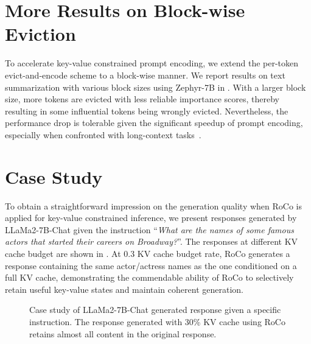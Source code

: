 \section{More Results on Block-wise Eviction} 
\label{sec:appendix_b}
To accelerate key-value constrained prompt encoding, we extend the per-token evict-and-encode scheme to a block-wise manner. We report results on text summarization with various block sizes using Zephyr-7B in . With a larger block size, more tokens are evicted with less reliable importance scores, thereby resulting in some influential tokens being wrongly evicted. Nevertheless, the performance drop is tolerable given the significant speedup of prompt encoding, especially when confronted with long-context tasks~\cite{liu2023lost,longbench,leval}.
\section{Case Study} 
\label{sec:appendix_c}
To obtain a straightforward impression on the generation quality when RoCo is applied for key-value constrained inference, we present responses generated by LLaMa2-7B-Chat given the instruction ``\textit{What are the names of some famous actors that started their careers on Broadway?}''. The responses at different KV cache budget are shown in . At 0.3 KV cache budget rate, RoCo generates a response containing the same actor/actress names as the one conditioned on a full KV cache, demonstrating the commendable ability of RoCo to selectively retain useful key-value states and maintain coherent generation.
\begin{figure}[t!]
	\centering
    \caption{Case study of LLaMa2-7B-Chat generated response given a specific instruction. The response generated with 30\% KV cache using RoCo retains almost all content in the original response.}
	\label{fig:case_study}
\end{figure}